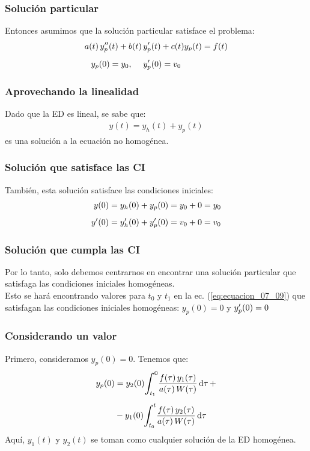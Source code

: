 \documentclass[12pt]{beamer}
\begin{document}
\begin{frame}
\frametitle{Solución particular}
Entonces asumimos que la solución particular satisface el problema:
\pause
\begin{eqnarray}
\begin{aligned}
a (t) \, {y}^{\prime \prime}_{p} (t) + b (t) \, &{y}^{\prime}_{p} (t) + c (t) y_{p} (t) = f (t) \\[0.5em]
y_{p} (0) = y_{0}, \hspace{0.5cm} &{y}^{\prime}_{p} (0) = v_{0}
\end{aligned}
\label{eq:ecuacion_07_14}
\end{eqnarray}
\end{frame}
\begin{frame}
\frametitle{Aprovechando la linealidad}
Dado que la ED es lineal, se sabe que:
\pause
\begin{align*}
y (t) = y_{h} (t) + y_{p} (t)
\end{align*}
es una solución a la ecuación no homogénea.
\end{frame}
\begin{frame}
\frametitle{Solución que satisface las CI}
También, esta solución satisface las condiciones iniciales:
\pause
\begin{align*}
y (0) &= y_{h} (0) + y_{p} (0) = y_{0} + 0 = y_{0} \\[0.5em]
{y}^{\prime} (0) &= {y}^{\prime}_{h} (0) + {y}^{\prime}_{p} (0) = v_{0} + 0 = v_{0}
\end{align*}
\end{frame}
\begin{frame}
\frametitle{Solución que cumpla las CI}
Por lo tanto, solo debemos centrarnos en encontrar una solución particular que satisfaga las condiciones iniciales homogéneas.
\\
\bigskip
\pause
Esto se hará encontrando valores para $t_{0}$ y $t_{1}$ en la ec. (\ref{eq:ecuacion_07_09}) que satisfagan las condiciones iniciales homogéneas: $y_{p} (0) = 0$ y ${y}^{\prime}_{p} (0) = 0$
\end{frame}
\begin{frame}
\frametitle{Considerando un valor}
Primero, consideramos $y_{p} (0) = 0$. \pause Tenemos que:
\pause
\begin{eqnarray}
\begin{aligned}
y_{p} (0) &= y_{2} (0) \scaleint{6ex}_{\bs t_{1}}^{0} \dfrac{f (\tau) \, y_{1} (\tau)}{a (\tau) \, W (\tau)} \dd{\tau} + \\[0.5em]
&- y_{1} (0) \scaleint{6ex}_{\bs t_{0}}^{t} \dfrac{f (\tau) \, y_{2} (\tau)}{a (\tau) \, W (\tau)} \dd{\tau}
\end{aligned}
\label{eq:ecuacion_07_15}
\end{eqnarray}
Aquí, $y_{1} (t)$ y $y_{2} (t)$ se toman como cualquier solución de la ED homogénea.
\end{frame}
\end{document}
